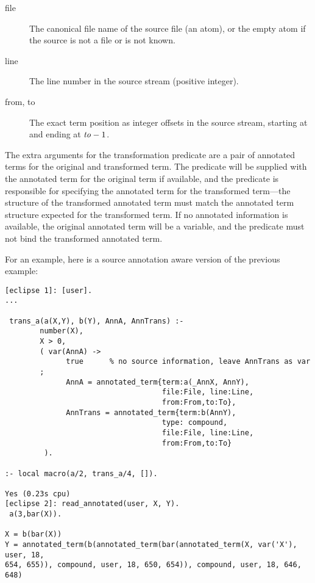 \begin{description}
\item[file]
    The canonical file name of the source file (an atom), or the
    empty atom  if the source is not a file or is not
    known.

\item[line]
    The line number in the source stream (positive integer).

\item[from, to]
    The exact term position as integer offsets in the source stream,
    starting at  and ending at $\mbox{\emph{to}}-1$.
\end{description}

The extra arguments for the transformation predicate are a pair of
annotated terms for the original and transformed term. The predicate will
be supplied with the annotated term for the original term if available,
and the predicate is responsible for specifying the annotated term for the
transformed term---the structure of the transformed annotated term must
match the annotated term structure expected for the transformed term. If
no annotated information is available, the original annotated term will be
a variable, and the predicate must not bind the transformed annotated term.

For an example, here is a source annotation aware version of the previous
 example:

\begin{verbatim}
[eclipse 1]: [user].
...

 trans_a(a(X,Y), b(Y), AnnA, AnnTrans) :-
        number(X),
        X > 0,
        ( var(AnnA) ->
              true      % no source information, leave AnnTrans as var
        ;
              AnnA = annotated_term{term:a(_AnnX, AnnY),
                                    file:File, line:Line,
                                    from:From,to:To},
              AnnTrans = annotated_term{term:b(AnnY),
                                    type: compound,
                                    file:File, line:Line,
                                    from:From,to:To}
         ).

:- local macro(a/2, trans_a/4, []).

Yes (0.23s cpu)
[eclipse 2]: read_annotated(user, X, Y).
 a(3,bar(X)).

X = b(bar(X))
Y = annotated_term(b(annotated_term(bar(annotated_term(X, var('X'), user, 18,
654, 655)), compound, user, 18, 650, 654)), compound, user, 18, 646, 648)

\end{verbatim}

